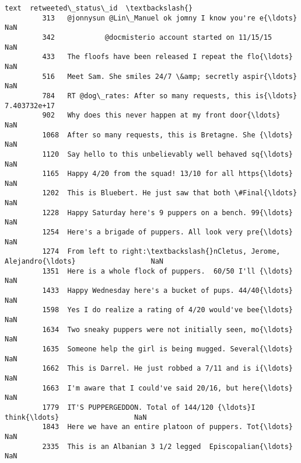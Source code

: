 \documentclass[11pt]{article}
\begin{document}
\begin{Verbatim}[commandchars=\\\{\}]
                                                            text  retweeted\_status\_id  \textbackslash{}
         313   @jonnysun @Lin\_Manuel ok jomny I know you're e{\ldots}                  NaN   
         342            @docmisterio account started on 11/15/15                  NaN   
         433   The floofs have been released I repeat the flo{\ldots}                  NaN   
         516   Meet Sam. She smiles 24/7 \&amp; secretly aspir{\ldots}                  NaN   
         784   RT @dog\_rates: After so many requests, this is{\ldots}         7.403732e+17   
         902   Why does this never happen at my front door{\ldots}                  NaN   
         1068  After so many requests, this is Bretagne. She {\ldots}                  NaN   
         1120  Say hello to this unbelievably well behaved sq{\ldots}                  NaN   
         1165  Happy 4/20 from the squad! 13/10 for all https{\ldots}                  NaN   
         1202  This is Bluebert. He just saw that both \#Final{\ldots}                  NaN   
         1228  Happy Saturday here's 9 puppers on a bench. 99{\ldots}                  NaN   
         1254  Here's a brigade of puppers. All look very pre{\ldots}                  NaN   
         1274  From left to right:\textbackslash{}nCletus, Jerome, Alejandro{\ldots}                  NaN   
         1351  Here is a whole flock of puppers.  60/50 I'll {\ldots}                  NaN   
         1433  Happy Wednesday here's a bucket of pups. 44/40{\ldots}                  NaN   
         1598  Yes I do realize a rating of 4/20 would've bee{\ldots}                  NaN   
         1634  Two sneaky puppers were not initially seen, mo{\ldots}                  NaN   
         1635  Someone help the girl is being mugged. Several{\ldots}                  NaN   
         1662  This is Darrel. He just robbed a 7/11 and is i{\ldots}                  NaN   
         1663  I'm aware that I could've said 20/16, but here{\ldots}                  NaN   
         1779  IT'S PUPPERGEDDON. Total of 144/120 {\ldots}I think{\ldots}                  NaN   
         1843  Here we have an entire platoon of puppers. Tot{\ldots}                  NaN   
         2335  This is an Albanian 3 1/2 legged  Episcopalian{\ldots}                  NaN   
         

\end{Verbatim}
\end{document}
